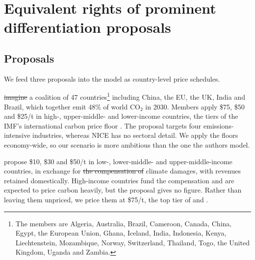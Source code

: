 \documentclass[12pt,english]{article}
\theoremstyle{remark}
\providecommand{\DIFaddtex}[1]{{\protect\color{blue}\uwave{#1}}} %
\providecommand{\DIFdeltex}[1]{{\protect\color{red}\sout{#1}}}                      %
\providecommand{\DIFaddbegin}{} %
\providecommand{\DIFaddend}{} %
\providecommand{\DIFdelbegin}{} %
\providecommand{\DIFdelend}{} %
\providecommand{\DIFadd}[1]{\texorpdfstring{\DIFaddtex{#1}}{#1}} %
\providecommand{\DIFdel}[1]{\texorpdfstring{\DIFdeltex{#1}}{}} %
\newcommand{\DIFscaledelfig}{0.5}
\newlength{\DIFdelgraphicswidth} %
\newlength{\DIFdelgraphicsheight} %
\newcommand{\DIFaddincludegraphics}[2][]{{\color{blue}\fbox{\DIFOincludegraphics[#1]{#2}}}} %
\newcommand{\DIFdelincludegraphics}[2][]{%
\sbox{\DIFdelgraphicsbox}{\DIFOincludegraphics[#1]{#2}}%
\settoboxwidth{\DIFdelgraphicswidth}{\DIFdelgraphicsbox} %
\settoboxtotalheight{\DIFdelgraphicsheight}{\DIFdelgraphicsbox} %
\scalebox{\DIFscaledelfig}{%
\parbox[b]{\DIFdelgraphicswidth}{\usebox{\DIFdelgraphicsbox}\\[-\baselineskip] \rule{\DIFdelgraphicswidth}{0em}}\llap{\resizebox{\DIFdelgraphicswidth}{\DIFdelgraphicsheight}{%
\setlength{\unitlength}{\DIFdelgraphicswidth}%
\begin{picture}(1,1)%
\thicklines\linethickness{2pt} %
{\color[rgb]{1,0,0}\put(0,0){\framebox(1,1){}}}%
{\color[rgb]{1,0,0}\put(0,0){\line( 1,1){1}}}%
{\color[rgb]{1,0,0}\put(0,1){\line(1,-1){1}}}%
\end{picture}%
}\hspace*{3pt}}} %
} %
\DeclareRobustCommand{\DIFaddbegin}{\DIFOaddbegin \let\includegraphics\DIFaddincludegraphics} %
\DeclareRobustCommand{\DIFaddend}{\DIFOaddend \let\includegraphics\DIFOincludegraphics} %
\DeclareRobustCommand{\DIFdelbegin}{\DIFOdelbegin \let\includegraphics\DIFdelincludegraphics} %
\DeclareRobustCommand{\DIFdelend}{\DIFOaddend \let\includegraphics\DIFOincludegraphics} %
\begin{document}
\section{Equivalent rights of prominent differentiation proposals}
\label{sec:proposals}

\subsection{Proposals}

We feed three proposals into the model as country-level price schedules.

\citet{wolfram_building_2025} \DIFdelbegin \DIFdel{imagine }\DIFdelend \DIFaddbegin \DIFadd{envisage }\DIFaddend a coalition of 47 countries\footnote{The members are Algeria, Australia, Brazil, Cameroon, Canada, China, Egypt, the European Union, Ghana, Iceland, India, Indonesia, Kenya, Liechtenstein, Mozambique, Norway, Switzerland, Thailand, Togo, the United Kingdom, Uganda and Zambia.} including China, the EU, the UK, India and Brazil, which together emit 48\% of world CO$_2$ in 2030. Members apply \$75, \$50 and \$25/t in high-, upper-middle- and lower-income countries, the tiers of the IMF's international carbon price floor \citep{parry_proposal_2021}. The proposal targets four emissions-intensive industries, whereas NICE has no sectoral detail. We apply the floors economy-wide, so our scenario is more ambitious than the one the authors model.

\citet{banerjee_grand_2025} propose \$10, \$30 and \$50/t in low-, lower-middle- and upper-middle-income countries, in exchange for \DIFdelbegin \DIFdel{the compensation of }\DIFdelend \DIFaddbegin \DIFadd{compensation for }\DIFaddend climate damages, with revenues retained domestically. High-income countries fund the compensation and are expected to price carbon heavily, but the proposal gives no figure. Rather than leaving them unpriced, we price them at \$75/t, the top tier of \citet{parry_proposal_2021} and \citet{wolfram_building_2025}.
\end{document}
